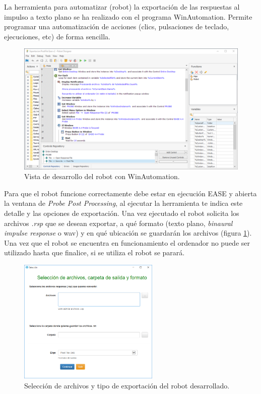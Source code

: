 La herramienta para automatizar (robot) la exportación de las respuestas al impulso a texto plano se ha realizado con el programa WinAutomation. Permite programar una automatización de acciones (clics, pulsaciones de teclado, ejecuciones, etc) de forma sencilla.
\begin{figure}[ht]
    \centering
    \includegraphics[width=\textwidth]{archivos/capturas/winauto}
    \caption{Vista de desarrollo del robot con WinAutomation.}
\end{figure}
\FloatBarrier

Para que el robot funcione correctamente debe estar en ejecución EASE y abierta la ventana de \textit{Probe Post Processing}, al ejecutar la herramienta te indica este detalle y las opciones de exportación.
Una vez ejecutado el robot solicita los archivos \textit{.rsp} que se desean exportar, a qué formato (texto plano, \textit{binaural impulse response} o wav) y en qué ubicación se guardarán los archivos (figura \ref{ventanarobot}). Una vez que el robot se encuentra en funcionamiento el ordenador no puede ser utilizado hasta que finalice, si se utiliza el robot se parará.

\begin{figure}[ht]
    \centering
    \includegraphics[width=0.6\textwidth]{archivos/capturas/autoexport}
    \caption{Selección de archivos y tipo de exportación del robot desarrollado.}
    \label{ventanarobot}
\end{figure}
\FloatBarrier

